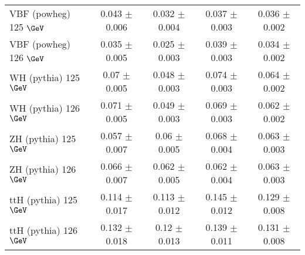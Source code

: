 \begin{sidewaystable}[!h!tb]
\begin{center}
\begin{tabular}{|l|c|c|c|c|}
VBF ({\sc powheg}) 125 $\GeV$  & 0.043  $\pm$  0.006  & 0.032  $\pm$  0.004  & 0.037  $\pm$  0.003  & 0.036  $\pm$  0.002  \\
VBF ({\sc powheg}) 126 $\GeV$  & 0.035  $\pm$  0.005  & 0.025  $\pm$  0.003  & 0.039  $\pm$  0.003  & 0.034  $\pm$  0.002  \\
WH ({\sc pythia}) 125 $\GeV$  & 0.07  $\pm$  0.005  & 0.048  $\pm$  0.003  & 0.074  $\pm$  0.003  & 0.064  $\pm$  0.002  \\
WH ({\sc pythia}) 126 $\GeV$  & 0.071  $\pm$  0.005  & 0.049  $\pm$  0.003  & 0.069  $\pm$  0.003  & 0.062  $\pm$  0.002  \\
ZH ({\sc pythia}) 125 $\GeV$  & 0.057  $\pm$  0.007  & 0.06  $\pm$  0.005  & 0.068  $\pm$  0.004  & 0.063  $\pm$  0.003  \\
ZH ({\sc pythia}) 126 $\GeV$  & 0.066  $\pm$  0.007  & 0.062  $\pm$  0.005  & 0.062  $\pm$  0.004  & 0.063  $\pm$  0.003  \\
ttH ({\sc pythia}) 125 $\GeV$  & 0.114  $\pm$  0.017  & 0.113  $\pm$  0.012  & 0.145  $\pm$  0.012  & 0.129  $\pm$  0.008  \\
ttH ({\sc pythia}) 126 $\GeV$  & 0.132  $\pm$  0.018  & 0.12  $\pm$  0.013  & 0.139  $\pm$  0.011  & 0.131  $\pm$  0.008  \\
\hline
\end{tabular}
\normalsize
\end{center}
\end{sidewaystable}


